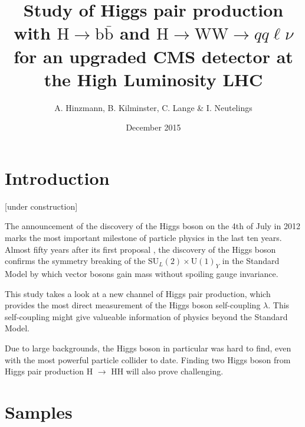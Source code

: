 \documentclass[10pt,a4paper]{article}
\title{Study of Higgs pair production with $\text{H} \rightarrow \text{b}\bar{\text{b}}$ and $\text{H} \rightarrow \text{WW} \rightarrow qq\ell\nu$ for an upgraded CMS detector at the High Luminosity LHC}
\author{A. Hinzmann, B. Kilminster, C. Lange \& I. Neutelings}
\affil{University of Zurich}
\date{December 2015}
\begin{document}
\maketitle




\section{Introduction}

[under construction]

The announcement of the discovery of the Higgs boson on the 4th of July in 2012 marks the most important milestone of particle physics in the last ten years. Almost fifty years after its first proposal \cite{EB,PH}, the discovery of the Higgs boson confirms the symmetry breaking of the $\mathrm{SU}_L(2)\times\mathrm{U}(1)_Y$ in the Standard Model by which vector bosons gain mass without spoiling gauge invariance. %


This study takes a look at a new channel of Higgs pair production, which provides the most direct measurement of the Higgs boson self-coupling $\lambda$. This self-coupling might give valueable information of physics beyond the Standard Model.

Due to large backgrounds, the Higgs boson in particular was hard to find, even with the most powerful particle collider to date. Finding two Higgs boson from Higgs pair production H $\rightarrow$ HH will also prove challenging.




\section{Samples}
\end{document}
